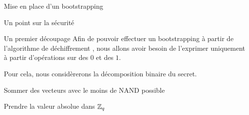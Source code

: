 \begin{section}{Mise en place d'un bootstrapping}
\begin{subsection}{Un point sur la sécurité}
\end{subsection}
\begin{subsection}{Un premier découpage}
Afin de pouvoir effectuer un bootstrapping à partir de l'algorithme de
déchiffrement , nous allons avoir besoin de
l'exprimer uniquement à partir d'opérations  sur des 
$0$ et des $1$. 

Pour cela, nous considèrerons la décomposition binaire du secret.
\end{subsection}
\begin{subsection}{Sommer des vecteurs avec le moins de NAND possible}
\end{subsection}
\begin{subsection}{Prendre la valeur absolue dans $\mathbb{Z}_q$}
\end{subsection}
\end{section}
